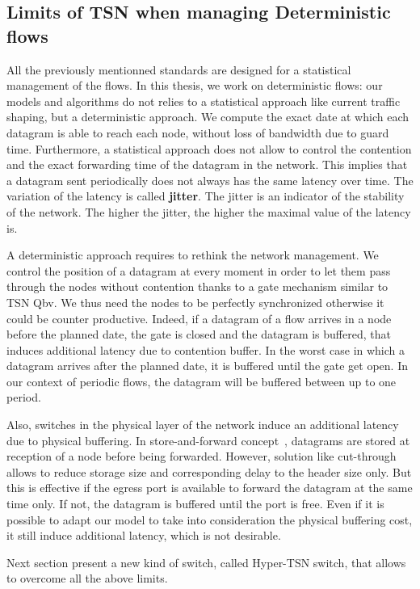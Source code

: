 \subsection{Limits of TSN when managing Deterministic flows}

All the previously mentionned standards are designed for a statistical management of the flows. In this thesis, we work on deterministic flows: our models and algorithms do not relies to a statistical approach like current traffic shaping, but a deterministic approach. We compute the exact date at which each datagram is able to reach each node, without loss of bandwidth due to guard time. Furthermore, a statistical approach does not allow to control the contention and the exact forwarding time of the datagram in the network. This implies that a datagram sent periodically does not always has the same latency over time. The variation of the latency is called \textbf{jitter}. The jitter is an indicator of the stability of the network. The higher the jitter, the higher the maximal value of the latency is.

A deterministic approach requires to rethink the network management. We control the position of a datagram at every moment in order to let them pass through the nodes without contention thanks to a gate mechanism similar to TSN Qbv. We thus need the nodes to be perfectly synchronized otherwise it could be counter productive. Indeed, if a datagram of a flow arrives in a node before the planned date, the gate is closed and the datagram is buffered, that induces additional latency due to contention buffer. In the worst case in which a datagram arrives after the planned date, it is buffered until the gate get open. In our context of periodic flows, the datagram will be buffered between up to one period.

Also, switches in the physical layer of the network induce an additional latency due to physical buffering. In store-and-forward concept~\cite{tindell1992store}, datagrams are stored at reception of a node before being forwarded. However, solution like cut-through~\cite{kermani1979virtual} allows to reduce storage size and corresponding delay to the header size only. But this is effective if the egress port is available to forward the datagram at the same time only. If not, the datagram is buffered until the port is free. Even if it is possible to adapt our model to take into consideration the physical buffering cost, it still induce additional latency, which is not desirable.

Next section present a new kind of switch, called Hyper-TSN switch, that allows to overcome all the above limits.

